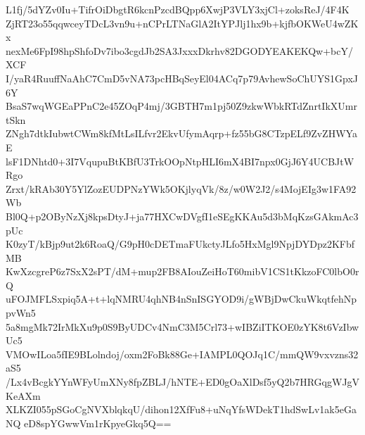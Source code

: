 L1fj/5dYZv0Iu+TifrOiDbgtR6kcnPzcdBQpp6XwjP3VLY3xjCl+zoksReJ/4F4K
ZjRT23o55qqwceyTDcL3vn9u+nCPrLTNaGlA2ItYPJlj1hx9b+kjfbOKWeU4wZKx
nexMe6FpI98hpShfoDv7ibo3cgdJb2SA3JxxxDkrhv82DGODYEAKEKQw+bcY/XCF
I/yaR4RuuffNaAhC7CmD5vNA73pcHBqSeyEl04ACq7p79AvhewSoChUYS1GpxJ6Y
BsaS7wqWGEaPPnC2e45ZOqP4mj/3GBTH7m1pj50Z9zkwWbkRTdZnrtIkXUmrtSkn
ZNgh7dtkIubwtCWm8kfMtLsILfvr2EkvUfymAqrp+fz55bG8CTzpELf9ZvZHWYaE
lsF1DNhtd0+3I7VqupuBtKBfU3TrkOOpNtpHLI6mX4BI7npx0GjJ6Y4UCBJtWRgo
Zrxt/kRAb30Y5YlZozEUDPNzYWk5OKjlyqVk/8z/w0W2J2/s4MojEIg3w1FA92Wb
Bl0Q+p2OByNzXj8kpsDtyJ+ja77HXCwDVgfI1eSEgKKAu5d3bMqKzsGAkmAc3pUc
K0zyT/kBjp9ut2k6RoaQ/G9pH0cDETmaFUkctyJLfo5HxMgl9NpjDYDpz2KFbfMB
KwXzcgreP6z7SxX2sPT/dM+mup2FB8AIouZeiHoT60mibV1CS1tKkzoFC0lbO0rQ
uFOJMFLSxpiq5A+t+lqNMRU4qhNB4nSnISGYOD9i/gWBjDwCkuWkqtfehNppvWn5
5a8mgMk72IrMkXu9p0S9ByUDCv4NmC3M5Crl73+wIBZiITKOE0zYK8t6VzIbwUc5
VMOwILoa5fIE9BLolndoj/oxm2FoBk88Ge+IAMPL0QOJq1C/mmQW9vxvzns32aS5
/Lx4vBcgkYYnWFyUmXNy8fpZBLJ/hNTE+ED0gOaXlDsf5yQ2b7HRGqgWJgVKeAXm
XLKZI055pSGoCgNVXblqkqU/dihon12XfFu8+uNqYfsWDekT1hdSwLv1ak5eGaNQ
eD8spYGwwVm1rKpyeGkq5Q==

